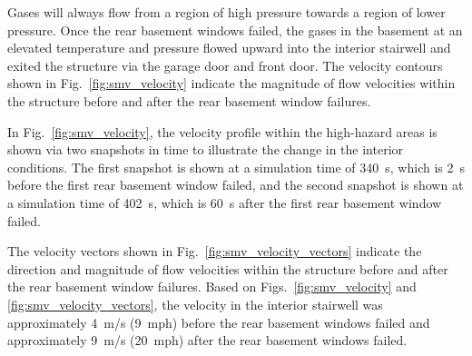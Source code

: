 \documentclass[12pt,oneside]{book}
\begin{document}
Gases will always flow from a region of high pressure towards a region of lower pressure. Once the rear basement windows failed, the gases in the basement at an elevated temperature and pressure flowed upward into the interior stairwell and exited the structure via the garage door and front door. The velocity contours shown in Fig.~\ref{fig:smv_velocity} indicate the magnitude of flow velocities within the structure before and after the rear basement window failures.

In Fig.~\ref{fig:smv_velocity}, the velocity profile within the high-hazard areas is shown via two snapshots in time to illustrate the change in the interior conditions. The first snapshot is shown at a simulation time of 340~s, which is 2~s before the first rear basement window failed, and the second snapshot is shown at a simulation time of 402~s, which is 60~s after the first rear basement window failed.

The velocity vectors shown in Fig.~\ref{fig:smv_velocity_vectors} indicate the direction and magnitude of flow velocities within the structure before and after the rear basement window failures. Based on Figs.~\ref{fig:smv_velocity} and \ref{fig:smv_velocity_vectors}, the velocity in the interior stairwell was approximately 4~m/s (9~mph) before the rear basement windows failed and approximately 9~m/s (20~mph) after the rear basement windows failed.
\end{document}
